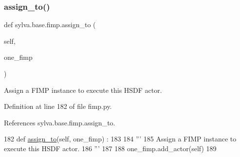 \subsubsection{\texorpdfstring{assign\+\_\+to()}{assign\_to()}}
{\footnotesize\ttfamily def sylva.\+base.\+fimp.\+assign\+\_\+to (\begin{DoxyParamCaption}\item[{}]{self,  }\item[{}]{one\+\_\+fimp }\end{DoxyParamCaption})}

\begin{DoxyVerb}  Assign a FIMP instance to execute this HSDF actor.
\end{DoxyVerb}
 

Definition at line 182 of file fimp.\+py.



References sylva.\+base.\+fimp.\+assign\+\_\+to.


\begin{DoxyCode}
182   \textcolor{keyword}{def }\hyperlink{namespacesylva_1_1base_1_1fimp_ad6282a735b53c953ed8ac941c4dbf17a}{assign\_to}(self, one\_fimp) :
183 
184     \textcolor{stringliteral}{'''}
185 \textcolor{stringliteral}{      Assign a FIMP instance to execute this HSDF actor.}
186 \textcolor{stringliteral}{    '''}
187 
188     one\_fimp.add\_actor(self)
189 
\end{DoxyCode}
\mbox{\label{namespacesylva_1_1base_1_1fimp_a437b2db1db9bdd48145289d66871b835}} 
